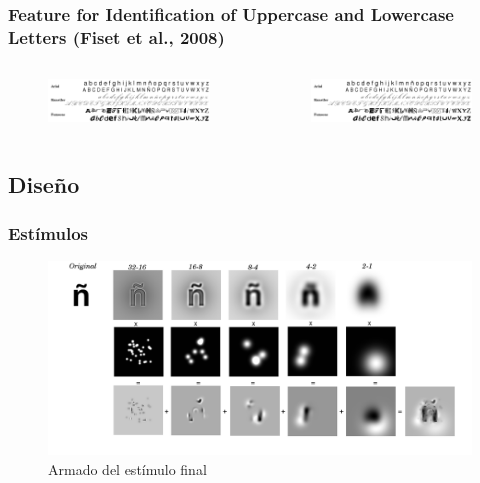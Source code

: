 \documentclass{beamer}
\begin{document}
\begin{frame}
\frametitle{Feature for Identification of Uppercase and Lowercase Letters (Fiset et al., 2008)}

\begin{columns}[t]
  \begin{figure}
    \includegraphics[scale=.10]{graficos/letras.png}
  \end{figure}
   \begin{figure}
    \includegraphics[scale=.1]{graficos/letras.png}
   \end{figure}
\end{columns}

\end{frame}



\subsection{Diseño}
\begin{frame}
\frametitle{Est\'imulos}
\begin{figure}
 \includegraphics[width=\textwidth]{graficos/estimulofinal.png}
\caption{Armado del est\'imulo final}
\end{figure}
\end{frame}
\end{document}
